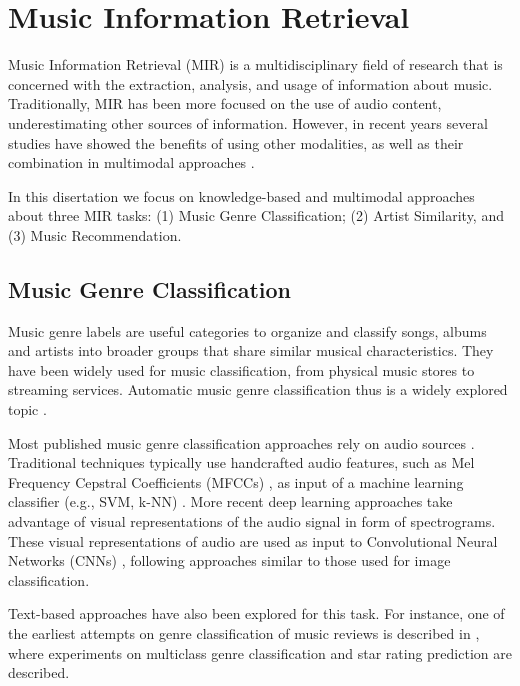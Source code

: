 \section{Music Information Retrieval}
\label{sec:SOA:mir}

Music Information Retrieval (MIR) is a multidisciplinary field of research that is concerned with the extraction, analysis, and usage of information about music. Traditionally, MIR has been more focused on the use of audio content, underestimating other sources of information. However, in recent years several studies have showed the benefits of using other modalities, as well as their combination in multimodal approaches \cite{Schedl2014}. 

In this disertation we focus on knowledge-based and multimodal approaches about three MIR tasks: (1) Music Genre Classification; (2) Artist Similarity, and (3) Music Recommendation.


\subsection{Music Genre Classification}
\label{sec:SOA:mir:classfication}

Music genre labels are useful categories to organize and classify songs, albums and artists into broader groups that share similar musical characteristics. They have been widely used for music classification, from physical music stores to streaming services. Automatic music genre classification thus is a widely explored topic \citep{sturm2012survey}.

Most published music genre classification approaches rely on audio sources \citep{sturm2012survey,bogdanov2016cross}. 
Traditional techniques typically use handcrafted audio features, such as Mel Frequency Cepstral Coefficients (MFCCs) \citep{logan2000mel}, as input of a machine learning classifier (e.g., SVM, k-NN) \citep{Tzanetakis2002,seyerlehner2010using}.
More recent deep learning approaches take advantage of visual representations of the audio signal in form of spectrograms.
These visual representations of audio are used as input to Convolutional Neural Networks (CNNs) \citep{dieleman2011audio,dieleman2014end,pons2016experimenting,Choi2016,choi2016convolutional}, following approaches similar to those used for image classification.

Text-based approaches have also been explored for this task. For instance, one of the earliest attempts on genre classification of music reviews is described in \citep{Hu2005}, where experiments on multiclass genre classification and star rating prediction are described. %

